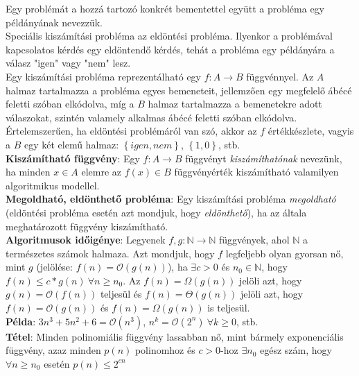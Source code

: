 \documentclass[margin=0px]{article}
\begin{document}
\noindent Egy problémát a hozzá tartozó konkrét bementettel együtt a probléma egy
példányának nevezzük.\\

Speciális kiszámítási probléma az eldöntési probléma. Ilyenkor a problémával
kapcsolatos kérdés egy eldöntendő kérdés, tehát a probléma egy példányára a
válasz "igen" vagy "nem" lesz.\\

Egy kiszámítási probléma reprezentálható egy $f : A \to B$ függvénnyel. Az $A$
halmaz tartalmazza a probléma egyes bemeneteit, jellemzően egy megfelelő ábécé
feletti szóban elkódolva, míg a $B$ halmaz tartalmazza a bemenetekre adott
válaszokat, szintén valamely alkalmas ábécé feletti szóban elkódolva. Értelemszerűen,
ha eldöntési problémáról van szó, akkor az $f$ értékkészlete, vagyis a $B$
egy két elemű halmaz: $\left\{igen, nem\right\}$, $\left\{1, 0\right\}$, stb.\\

\noindent \textbf{Kiszámítható függvény}: Egy $f : A \to B$ függvényt \textit{kiszámíthatónak}
nevezünk, ha minden $x \in A$ elemre az $f(x) \in B$ függvényérték kiszámítható valamilyen
algoritmikus modellel.\\

\noindent \textbf{Megoldható, eldönthető probléma}: Egy kiszámítási probléma \textit{megoldható}
(eldöntési probléma esetén azt mondjuk, hogy \textit{eldönthető}), ha az általa meghatározott
függvény kiszámítható.\\

\noindent \textbf{Algoritmusok időigénye}: Legyenek $f,g: \mathbb{N} \to \mathbb{N}$ függvények, ahol
$\mathbb{N}$ a természetes számok halmaza. Azt mondjuk, hogy $f$ legfeljebb olyan gyorsan nő, mint $g$
(jelölése: $f(n) = \mathcal{O}(g(n))$), ha $\exists c>0$ és $n_{0} \in \mathbb{N}$, hogy
$f(n) \leq c * g(n) \ \forall n \geq n_{0}$. Az $f(n) = \Omega(g(n))$ jelöli azt, hogy $g(n) = \mathcal{O}(f(n))$
teljesül és $f(n) = \Theta(g(n))$ jelöli azt, hogy  $f(n) = \mathcal{O}(g(n))$ és $f(n) = \Omega(g(n))$ is teljesül.\\

\noindent \textbf{Példa}: $3n^{3} + 5n^{2} + 6 = \mathcal{O}(n^{3})$, $n^{k} = \mathcal{O}(2^{n}) \ \forall k \geq 0$, stb.\\

\noindent \textbf{Tétel}: Minden polinomiális függvény lassabban nő, mint bármely exponenciális függvény,
azaz minden $p(n)$ polinomhoz és $c>0$-hoz $\exists n_{0}$ egész szám, hogy $\forall n \geq n_{0}$ esetén $p(n) \leq 2^{cn}$\\
\end{document}
